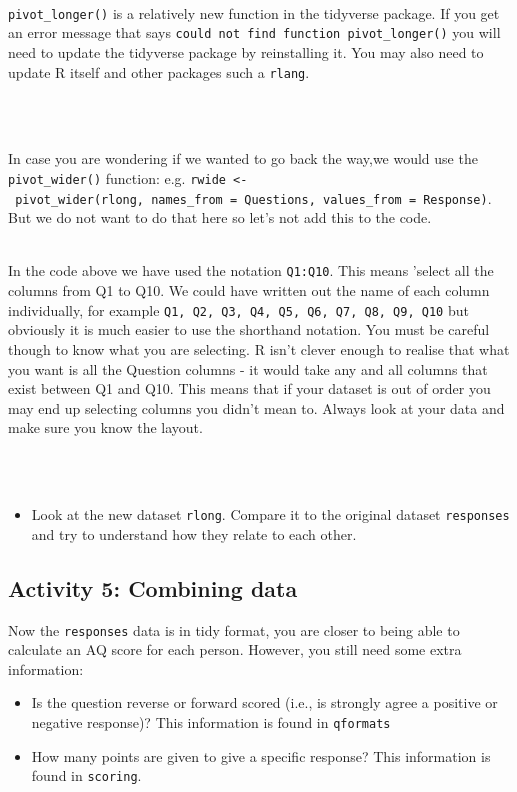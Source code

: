\documentclass[]{book}
\providecommand{\tightlist}{%
  \setlength{\itemsep}{0pt}\setlength{\parskip}{0pt}}
\newenvironment{warning}
    {
    \hline\\
    }
    { 
    \\\\\hline
    }
\begin{document}
\begin{warning}
\texttt{pivot\_longer()} is a relatively new function in the tidyverse
package. If you get an error message that says
\texttt{could\ not\ find\ function\ pivot\_longer()} you will need to
update the tidyverse package by reinstalling it. You may also need to
update R itself and other packages such a \texttt{rlang}.
\end{warning}

In case you are wondering if we wanted to go back the way,we would use the \texttt{pivot\_wider()} function: e.g. \texttt{rwide\ \textless{}-\ pivot\_wider(rlong,\ names\_from\ =\ Questions,\ values\_from\ =\ Response)}. But we do not want to do that here so let's not add this to the code.

\begin{warning}
In the code above we have used the notation \texttt{Q1:Q10}. This means
'select all the columns from Q1 to Q10. We could have written out the
name of each column individually, for example
\texttt{Q1,\ Q2,\ Q3,\ Q4,\ Q5,\ Q6,\ Q7,\ Q8,\ Q9,\ Q10} but obviously
it is much easier to use the shorthand notation. You must be careful
though to know what you are selecting. R isn't clever enough to realise
that what you want is all the Question columns - it would take any and
all columns that exist between Q1 and Q10. This means that if your
dataset is out of order you may end up selecting columns you didn't mean
to. Always look at your data and make sure you know the layout.
\end{warning}

\begin{itemize}
\tightlist
\item
  Look at the new dataset \texttt{rlong}. Compare it to the original dataset \texttt{responses} and try to understand how they relate to each other.
\end{itemize}

\hypertarget{join}{%
\subsection{Activity 5: Combining data}\label{join}}

Now the \texttt{responses} data is in tidy format, you are closer to being able to calculate an AQ score for each person. However, you still need some extra information:

\begin{itemize}
\tightlist
\item
  Is the question reverse or forward scored (i.e., is strongly agree a positive or negative response)? This information is found in \texttt{qformats}
\item
  How many points are given to give a specific response? This information is found in \texttt{scoring}.
\end{itemize}
\end{document}
